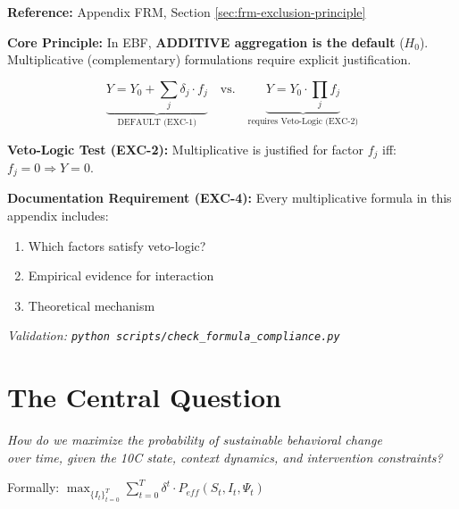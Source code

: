 \begin{tcolorbox}[colback=orange!5!white, colframe=orange!75!black,
    title=\textbf{Methodological Foundation: Exclusion Principle (EXC-1 to EXC-4)}]

\textbf{Reference:} Appendix FRM, Section \ref{sec:frm-exclusion-principle}

\textbf{Core Principle:} In EBF, \textbf{ADDITIVE aggregation is the default} ($H_0$). Multiplicative (complementary) formulations require explicit justification.

\begin{equation}
\boxed{
\underbrace{Y = Y_0 + \sum_j \delta_j \cdot f_j}_{\text{DEFAULT (EXC-1)}} \quad \text{vs.} \quad
\underbrace{Y = Y_0 \cdot \prod_j f_j}_{\text{requires Veto-Logic (EXC-2)}}
}
\end{equation}

\textbf{Veto-Logic Test (EXC-2):} Multiplicative is justified for factor $f_j$ iff: $f_j = 0 \Rightarrow Y = 0$.

\textbf{Documentation Requirement (EXC-4):} Every multiplicative formula in this appendix includes:
\begin{enumerate}[nosep]
    \item Which factors satisfy veto-logic?
    \item Empirical evidence for interaction
    \item Theoretical mechanism
\end{enumerate}

\textit{Validation: \texttt{python scripts/check\_formula\_compliance.py}}

\end{tcolorbox}

\section{The Central Question}
\label{sec:mp-central}

\begin{tcolorbox}[colback=red!5!white, colframe=red!75!black,
    title=\textbf{The Fundamental Question of EBF}]

\Large
\centering
\textit{How do we maximize the probability of sustainable behavioral change\\
over time, given the 10C state, context dynamics, and intervention constraints?}

\vspace{0.5em}
\normalsize
Formally: $\displaystyle\max_{\{I_t\}_{t=0}^T} \sum_{t=0}^{T} \delta^t \cdot P_{eff}(S_t, I_t, \Psi_t)$

\end{tcolorbox}

